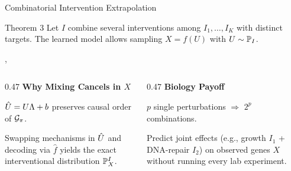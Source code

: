 \begin{frame}{Combinatorial Intervention Extrapolation}
  \vspace{1ex}
  \begin{statement}{Theorem 3}
    Let $I$ combine several interventions among $I_1,\dots,I_K$ with distinct targets. The learned model allows sampling $X = f(U)$ with $U \sim \mathbb{P}_I$.
  \end{statement}
  \sep\vspace{1.2\baselineskip}
  \begin{columns}[T]
    \begin{column}{0.47\textwidth}
      \textbf{Why Mixing Cancels in $X$}\par\smallskip
      $\hat{U} = U\Lambda + b$ preserves causal order of $\mathcal{G}_\pi$.\par\smallskip
      Swapping mechanisms in $\hat{U}$ and decoding via $\hat f$ yields the exact interventional distribution $\mathbb{P}^I_X$.
    \end{column}
    \begin{column}{0.47\textwidth}
      \textbf{Biology Payoff}\par\smallskip
      $p$ single perturbations $\Longrightarrow$ $2^p$ combinations.\par\smallskip
      Predict joint effects (e.g., growth $I_1$ + DNA-repair $I_2$) on observed genes $X$ without running every lab experiment.
    \end{column}
  \end{columns}
\end{frame}


